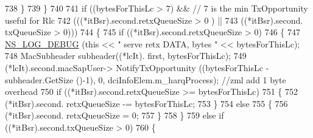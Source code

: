 \begin{DoxyCode}
738                                                                 \}
739                                                         \}
740 
741                                                         \textcolor{keywordflow}{if} ((bytesForThisLc > 7) && \textcolor{comment}{// 7 is the min
       TxOpportunity useful for Rlc}
742                                                                         (((*itBsr).second.retxQueueSize > 0
      ) ||
743                                                                                         ((*itBsr).second.
      txQueueSize > 0)))
744                                                         \{
745                                                                 \textcolor{keywordflow}{if} ((*itBsr).second.retxQueueSize > 0)
746                                                                 \{
747                                                                         
      \hyperlink{group__logging_ga413f1886406d49f59a6a0a89b77b4d0a}{NS\_LOG\_DEBUG} (\textcolor{keyword}{this} << \textcolor{stringliteral}{" serve retx DATA, bytes "} << bytesForThisLc);
748                                                                         MacSubheader subheader((*lcIt).
      first, bytesForThisLc);
749                                                                         (*lcIt).second.macSapUser->
      NotifyTxOpportunity ((bytesForThisLc - subheader.GetSize ()-1), 0, dciInfoElem.m\_harqProcess); \textcolor{comment}{//zml add 1 byte
       overhead}
750                                                                         \textcolor{keywordflow}{if} ((*itBsr).second.retxQueueSize 
      >= bytesForThisLc)
751                                                                         \{
752                                                                                 (*itBsr).second.
      retxQueueSize -= bytesForThisLc;
753                                                                         \}
754                                                                         \textcolor{keywordflow}{else}
755                                                                         \{
756                                                                                 (*itBsr).second.
      retxQueueSize = 0;
757                                                                         \}
758                                                                 \}
759                                                                 \textcolor{keywordflow}{else} \textcolor{keywordflow}{if} ((*itBsr).second.txQueueSize > 0)
760                                                                 \{

\end{DoxyCode}
